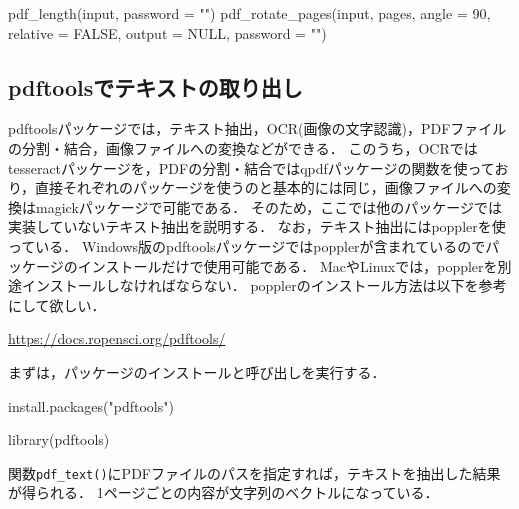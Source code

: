 \documentclass[
]{article}
\newenvironment{Shaded}{\begin{snugshade}}{\end{snugshade}}
\newcommand{\AttributeTok}[1]{\textcolor[rgb]{0.77,0.63,0.00}{#1}}
\newcommand{\ConstantTok}[1]{\textcolor[rgb]{0.00,0.00,0.00}{#1}}
\newcommand{\DecValTok}[1]{\textcolor[rgb]{0.00,0.00,0.81}{#1}}
\newcommand{\FunctionTok}[1]{\textcolor[rgb]{0.00,0.00,0.00}{#1}}
\newcommand{\NormalTok}[1]{#1}
\newcommand{\StringTok}[1]{\textcolor[rgb]{0.31,0.60,0.02}{#1}}
\begin{document}
\begin{Shaded}
\begin{Highlighting}[]
\FunctionTok{pdf\_length}\NormalTok{(input, }\AttributeTok{password =} \StringTok{""}\NormalTok{)   }
\FunctionTok{pdf\_rotate\_pages}\NormalTok{(input, pages, }\AttributeTok{angle =} \DecValTok{90}\NormalTok{, }\AttributeTok{relative =} \ConstantTok{FALSE}\NormalTok{, }\AttributeTok{output =} \ConstantTok{NULL}\NormalTok{, }\AttributeTok{password =} \StringTok{""}\NormalTok{)   }
\end{Highlighting}
\end{Shaded}

\hypertarget{pdftools}{%
\subsection{pdftoolsでテキストの取り出し}\label{pdftools}}

pdftoolsパッケージでは，テキスト抽出，OCR(画像の文字認識)，PDFファイルの分割・結合，画像ファイルへの変換などができる．
このうち，OCRではtesseractパッケージを，PDFの分割・結合ではqpdfパッケージの関数を使っており，直接それぞれのパッケージを使うのと基本的には同じ，画像ファイルへの変換はmagickパッケージで可能である．
そのため，ここでは他のパッケージでは実装していないテキスト抽出を説明する．
なお，テキスト抽出にはpopplerを使っている．
Windows版のpdftoolsパッケージではpopplerが含まれているのでパッケージのインストールだけで使用可能である．
MacやLinuxでは，popplerを別途インストールしなければならない．
popplerのインストール方法は以下を参考にして欲しい．

\url{https://docs.ropensci.org/pdftools/}

まずは，パッケージのインストールと呼び出しを実行する．

\begin{Shaded}
\begin{Highlighting}[]
\FunctionTok{install.packages}\NormalTok{(}\StringTok{"pdftools"}\NormalTok{)}
\end{Highlighting}
\end{Shaded}

\begin{Shaded}
\begin{Highlighting}[]
\FunctionTok{library}\NormalTok{(pdftools)}
\end{Highlighting}
\end{Shaded}

関数\texttt{pdf\_text()}にPDFファイルのパスを指定すれば，テキストを抽出した結果が得られる．
1ページごとの内容が文字列のベクトルになっている．
\end{document}
